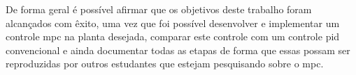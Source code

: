De forma geral é possível afirmar que os objetivos deste trabalho foram alcançados com êxito, uma vez que foi
possível desenvolver e implementar um controle \acrshort{mpc} na planta desejada, comparar este controle 
com um controle \acrshort{pid} convencional e ainda documentar todas as etapas de forma que essas possam ser reproduzidas
por outros estudantes que estejam pesquisando sobre o \acrlong{mpc}.


